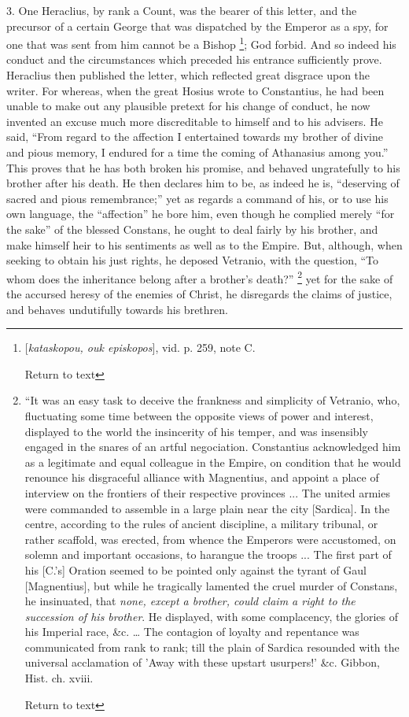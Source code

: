 3. One Heraclius, by rank a Count, was the bearer
of this letter, and the precursor of a certain George that was
dispatched by the Emperor as a spy, for one that was sent from him
cannot be a Bishop \footnote{[\emph{kataskopou, ouk episkopos}], vid. p.
259, note C.

Return to text}; God forbid. And so indeed his conduct and
the circumstances which preceded his entrance sufficiently prove. Heraclius then published the letter, which reflected great
disgrace upon the writer. For whereas, when the great Hosius wrote to
Constantius, he had been unable to make out any plausible pretext for
his change of conduct, he now invented an excuse much more
discreditable to himself and to his advisers. He said, ``From regard
to the affection I entertained towards my brother of divine and pious
memory, I endured for a time the coming of Athanasius among you.''
This proves that he has both broken his promise, and behaved
ungratefully to his brother after his death. He then declares him to
be, as indeed he is, ``deserving of sacred and pious remembrance;''
yet as regards a command of his, or to use his own language, the ``affection'' he bore him, even though he complied merely
``for the
sake'' of the blessed Constans, he ought to deal fairly by his
brother, and make himself heir to his sentiments as well as to
the Empire. But, although, when seeking to obtain his just rights, he
deposed Vetranio, with the question, ``To whom does the inheritance
belong after a brother's death?'' \footnote{``It was an easy task to deceive the
frankness and simplicity of Vetranio, who, fluctuating some time
between the opposite views of power and interest, displayed to the
world the insincerity of his temper, and was insensibly engaged in the
snares of an artful negociation. Constantius acknowledged him as a
legitimate and equal colleague in the Empire, on condition that he
would renounce his disgraceful alliance with Magnentius, and appoint a
place of interview on the frontiers of their respective provinces ...
The united armies were commanded to assemble in a large plain near the
city [Sardica]. In the centre, according to the rules of ancient discipline,
a military tribunal, or rather scaffold, was erected, from whence the
Emperors were accustomed, on solemn and important occasions, to
harangue the troops ... The first part of his [C.'s] Oration seemed
to be pointed only against the tyrant of Gaul [Magnentius], but while
he tragically lamented the cruel murder of Constans, he insinuated,
that \emph{none, except a brother, could claim a right to the succession
of his brother}. He displayed, with some complacency, the glories
of his Imperial race, \&c. … The contagion of loyalty and
repentance was communicated from rank to rank; till the plain of
Sardica resounded with the universal acclamation of 'Away with these
upstart usurpers!' \&c. Gibbon, Hist. ch. xviii.

Return to text} yet for the sake of the accursed
heresy of the enemies of Christ, he disregards the claims of justice,
and behaves undutifully towards his brethren.

